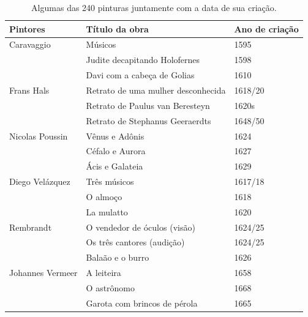 \begin{table} 
  \begin{center}
  \caption{\label{tab:paintings} Algumas das 240 pinturas juntamente com a data
    de sua criação.}

\begin{tabular}{l|l|l}
\hline

 Pintores & Título da obra                       & Ano de criação \\ 
 
 \hline

 Caravaggio          & Músicos & 1595 \\
                     & Judite decapitando Holofernes & 1598 \\
                     & Davi com a cabeça de Golias & 1610 \\
                      
 Frans Hals          & Retrato de uma mulher desconhecida & 1618/20 \\
                     & Retrato de Paulus van Beresteyn & 1620s \\
                     & Retrato de Stephanus Geeraerdts & 1648/50 \\

 Nicolas Poussin     & Vênus e Adônis & 1624 \\
                     & Céfalo e Aurora & 1627 \\
                     & Ácis e Galateia & 1629 \\
 
 Diego Velázquez     & Três músicos & 1617/18 \\
                     & O almoço & 1618 \\
                     & La mulatto & 1620 \\
 
 Rembrandt           & O vendedor de óculos (visão) & 1624/25 \\
                     & Os três cantores (audição) & 1624/25 \\
                     & Balaão e o burro & 1626 \\

Johannes Vermeer    & A leiteira & 1658 \\
                    & O astrônomo & 1668 \\
                    & Garota com brincos de pérola & 1665 \\
                    
\hline                
                    

\end{tabular}
\end{center}
\end{table}
